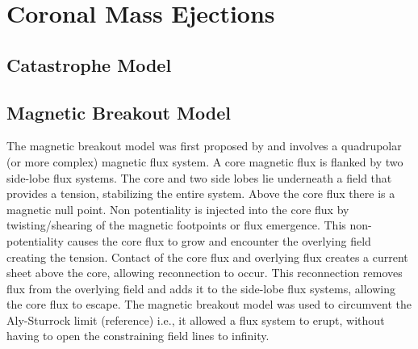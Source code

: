 \section{Coronal Mass Ejections}\label{sec:2}

\subsection{Catastrophe Model}\label{sec:20}

\subsection{Magnetic Breakout Model}\label{sec:21}

The magnetic breakout model was first proposed by \citep{antiochos1999} and involves a quadrupolar (or more complex) magnetic flux system. A core magnetic flux is flanked by two side-lobe flux systems. The core and two side lobes lie underneath a field that provides a tension, stabilizing the entire system. Above the core flux there is a magnetic null point. Non potentiality is injected into the core flux by twisting/shearing of the magnetic footpoints or flux emergence. This non-potentiality causes the core flux to grow and encounter the overlying field creating the tension. Contact of the core flux and overlying flux creates a current sheet above the core, allowing reconnection to occur. This reconnection removes flux from the overlying field and adds it to the side-lobe flux systems, allowing the core flux to escape. The magnetic breakout model was used to circumvent the Aly-Sturrock limit (reference) i.e., it allowed a flux system to erupt, without having to open the constraining field lines to infinity.
